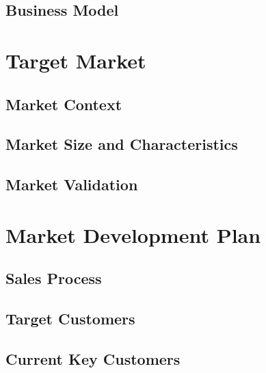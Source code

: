 \documentclass[11pt]{article}
\begin{document}
  \subsection{Business Model}
\section{Target Market}
  \subsection{Market Context}
  \subsection{Market Size and Characteristics}
  \subsection{Market Validation}
\section{Market Development Plan}
  \subsection{Sales Process}
  \subsection{Target Customers}
  \subsection{Current Key Customers}
\end{document}

